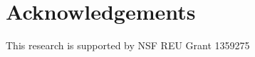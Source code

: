 \documentclass[conference]{IEEEtran}
\begin{document}
\section{Acknowledgements}
	This research is supported by NSF REU Grant 1359275

{ \vspace*{\columnsep} }



\end{document}
